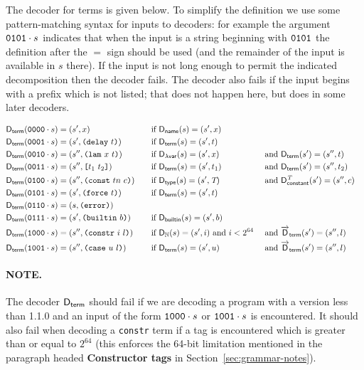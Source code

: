 \noindent The decoder for terms is given below.  To simplify the definition we
use some pattern-matching syntax for inputs to decoders: for example the
argument $\mathtt{0101} \cdot s$ indicates that when the input is a string
beginning with $\mathtt{0101}$ the definition after the $=$ sign should be used
(and the remainder of the input is available in $s$ there).  If the input is not
long enough to permit the indicated decomposition then the decoder fails.  The
decoder also fails if the input begins with a prefix which is not listed; that
does not happen here, but does in some later decoders.

\begin{alignat*}{5}
  \Dterm(\bits{0000} \cdot s)  &= (s', x) &&\quad \text{if } \Dname(s) = (s', x) \\
  \Dterm(\bits{0001} \cdot s)  &= (s', \Delay{t})  &&\quad \text{if}\ \Dterm(s) = (s', t) \\
  \Dterm(\bits{0010} \cdot s)  &= (s'', \Lam{x}{t})  &&\quad \text{if}\ \Dbinder(s) = (s', x)
                                                           &&\ \text{and}\ \Dterm(s') = (s'', t) \\
  \Dterm(\bits{0011} \cdot s)  &= (s'', \Apply{t_1}{t_2}) &&\quad \text{if}\ \Dterm(s) = (s', t_1)
                                                  &&\ \text{and}\ \Dterm(s') = (s'', t_2) \\
  \Dterm(\bits{0100} \cdot s)  &= (s'', \Const{tn}{c}) &&\quad \text{if}\ \Dtype(s) = (s', \tn)
                                                           &&\ \text{and}\ \Dconstant{\tn}(s') =(s'', c) \\
  \Dterm(\bits{0101} \cdot s)  &= (s', \Force{t})  &&\quad \text{if}\ \Dterm(s) = (s', t) \\
  \Dterm(\bits{0110} \cdot s)  &= (s, \Error)  && \\
  \Dterm(\bits{0111} \cdot s)  &= (s', \Builtin{b}) &&\quad \text{if } \Dbuiltin(s) = (s', b) \\
  \Dterm(\bits{1000} \cdot s)  &= (s'', \Constr{i}{l}) &&\quad \text{if } \D_{\N}(s) = (s', i)\ \text{and}\ i < 2^{64} &&\ \text{and}\ \Dlist_{\mathsf{term}}(s') = (s'', l)\\
  \Dterm(\bits{1001} \cdot s)  &= (s'', \Kase{u}{l}) &&\quad \text{if } \Dterm(s) = (s', u) &&\ \text{and}\ \Dlist_{\mathsf{term}}(s') = (s'', l)
\end{alignat*}

\paragraph{NOTE.} The decoder $\mathsf{D}_{\mathsf{term}}$ should fail if we are decoding a program
with a version less than 1.1.0 and an input of the form $\mathtt{1000} \cdot s$ or
$\mathtt{1001} \cdot s$ is encountered.  It should also fail when decoding a
\texttt{constr} term if a tag is encountered which is greater than or equal to
$2^{64}$ (this enforces the 64-bit limitation mentioned in the paragraph headed
\textbf{Constructor tags} in Section~\ref{sec:grammar-notes}).

